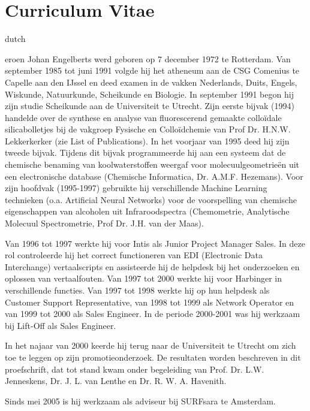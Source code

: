 \chapter*{Curriculum Vitae}
\fancyhead[RO]{\thepage}
\fancyhead[LE]{\thepage}
\begin{otherlanguage*}{dutch}
\label{cv}

\lettrine{}{}eroen Johan Engelberts werd geboren op 7 december 1972 te Rotterdam. Van september 1985 tot juni 1991 volgde hij het atheneum aan de CSG Comenius te Capelle aan den IJssel en deed examen in de vakken Nederlands, Duits, Engels, Wiskunde, Natuurkunde, Scheikunde en Biologie. In september 1991 begon hij zijn studie Scheikunde aan de Universiteit te Utrecht. Zijn eerste bijvak (1994) handelde over de synthese en analyse van fluorescerend gemaakte collo\"idale silicabolletjes bij de vakgroep Fysische en Collo\"idchemie van Prof Dr. H.N.W. Lekkerkerker (zie List of Publications). In het voorjaar van 1995 deed hij zijn tweede bijvak. Tijdens dit bijvak programmeerde hij aan een systeem dat de chemische benaming van koolwaterstoffen weergaf voor molecuulgeometrie\"en uit een electronische database (Chemische Informatica, Dr. A.M.F. Hezemans). Voor zijn hoofdvak (1995-1997) gebruikte hij verschillende Machine Learning technieken (o.a. Artificial Neural Networks) voor de voorspelling van chemische eigenschappen van alcoholen uit Infraroodspectra (Chemometrie, Analytische Molecuul Spectrometrie, Prof Dr. J.H. van der Maas).

Van 1996 tot 1997 werkte hij voor Intis als Junior Project Manager Sales. In deze rol controleerde hij het correct functioneren van EDI (Electronic Data Interchange) vertaalscripts en assisteerde hij de helpdesk bij het onderzoeken en oplossen van vertaalfouten.  Van 1997 tot 2000 werkte hij voor Harbinger in verschillende functies. Van 1997 tot 1998 werkte hij op hun helpdesk als Customer Support Representative, van 1998 tot 1999 als Network Operator en van 1999 tot 2000 als Sales Engineer. In de periode 2000-2001 was hij werkzaam bij Lift-Off als Sales Engineer.

In het najaar van 2000 keerde hij terug naar de Universiteit te Utrecht om zich toe te leggen op zijn promotieonderzoek. De resultaten worden beschreven in dit proefschrift, dat tot stand kwam onder begeleiding van  Prof. Dr. L.W.  Jenneskens, Dr. J. L. van Lenthe en Dr. R. W. A. Havenith.

Sinds mei 2005 is hij werkzaam als adviseur bij SURFsara te Amsterdam.
\end{otherlanguage*}
